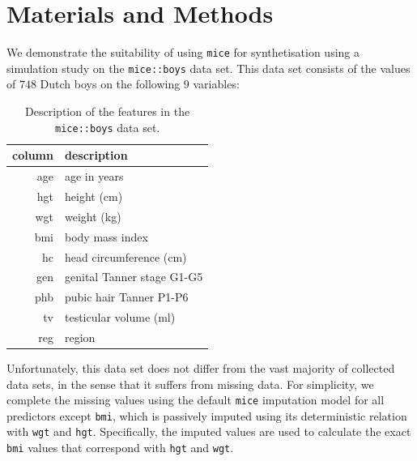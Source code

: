\documentclass[psych,article,submit,moreauthors,pdftex]{mdpi}
\begin{document}
\hypertarget{materials-and-methods}{%
\section{Materials and Methods}\label{materials-and-methods}}

We demonstrate the suitability of using \texttt{mice} for synthetisation
using a simulation study on the \texttt{mice::boys} data set. This data
set consists of the values of \(748\) Dutch boys on the following \(9\)
variables:

\begin{table}[H]
\caption{Description of the features in the \texttt{mice::boys} data set.}
\centering
\begin{tabular}{rl}
\hline
column & description                \\ 
\hline
age    & age in years               \\ 
hgt    & height (cm)                \\ 
wgt    & weight (kg)                \\ 
bmi    & body mass index            \\ 
hc     & head circumference (cm)    \\ 
gen    & genital Tanner stage G1-G5 \\ 
phb    & pubic hair Tanner P1-P6    \\ 
tv     & testicular volume (ml)     \\ 
reg    & region                     \\ 
\hline
\end{tabular}
\end{table}

Unfortunately, this data set does not differ from the vast majority of
collected data sets, in the sense that it suffers from missing data. For
simplicity, we complete the missing values using the default
\texttt{mice} imputation model for all predictors except \texttt{bmi},
which is passively imputed using its deterministic relation with
\texttt{wgt} and \texttt{hgt}. Specifically, the imputed values are used
to calculate the exact \texttt{bmi} values that correspond with
\texttt{hgt} and \texttt{wgt}.
\end{document}
